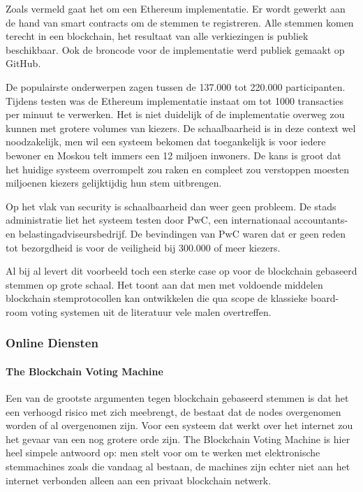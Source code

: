 				Zoals vermeld gaat het om een Ethereum implementatie. Er wordt gewerkt aan de hand van smart contracts om de stemmen te registreren. Alle stemmen komen terecht in een  blockchain, het resultaat van alle verkiezingen is publiek beschikbaar. Ook de broncode voor de implementatie werd publiek gemaakt op GitHub.
				
				De populairste onderwerpen zagen tussen de 137.000 tot 220.000 participanten. Tijdens testen was de  Ethereum implementatie  instaat om tot 1000 transacties per minuut te verwerken. Het is niet duidelijk of de implementatie overweg zou kunnen met  grotere volumes van kiezers. De schaalbaarheid is in deze context wel noodzakelijk, men wil een systeem bekomen dat toegankelijk is voor iedere bewoner en Moskou telt immers een 12 miljoen inwoners. De kans is groot dat het huidige systeem overrompelt zou raken en compleet zou verstoppen moesten miljoenen kiezers gelijktijdig hun stem uitbrengen.
				
				Op het vlak van security is schaalbaarheid dan weer geen probleem. De stads administratie liet het systeem testen door PwC, een internationaal accountants- en belastingadviseursbedrijf. De bevindingen van PwC waren dat er geen reden tot bezorgdheid is voor de veiligheid bij  300.000 of meer kiezers. 
				
				Al bij al levert dit voorbeeld toch een sterke case op voor de blockchain gebaseerd stemmen op grote schaal. Het toont aan dat men met voldoende middelen blockchain stemprotocollen kan ontwikkelen die qua scope de klassieke board-room voting systemen uit de literatuur vele malen overtreffen. 
			\subsubsection{Online Diensten}
				\paragraph{The Blockchain Voting Machine }
					Een van de grootste argumenten tegen blockchain gebaseerd stemmen is dat het een verhoogd risico met zich meebrengt, de bestaat  dat de nodes overgenomen worden of al overgenomen zijn. Voor een systeem dat werkt over het internet zou het gevaar van een nog grotere orde zijn. The Blockchain Voting Machine is hier heel simpele antwoord op: men stelt voor om te werken met elektronische stemmachines zoals die vandaag al bestaan,   de machines zijn echter niet aan het internet verbonden alleen aan een privaat blockchain netwerk. 
